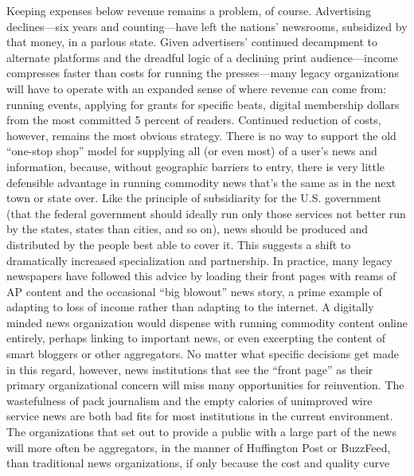 Keeping expenses below revenue remains a problem, of course. Advertising
declines—six years and counting—have left the nations’ newsrooms, subsidized
by that money, in a parlous state. Given advertisers’ continued decampment to
alternate platforms and the dreadful logic of a declining print audience—income
compresses faster than costs for running the presses—many legacy organizations
will have to operate with an expanded sense of where revenue can come from:
running events, applying for grants for specific beats, digital membership dollars
from the most committed 5 percent of readers. Continued reduction of costs,
however, remains the most obvious strategy.
There is no way to support the old ``one-stop shop'' model for supplying all (or
even most) of a user’s news and information, because, without geographic barriers
to entry, there is very little defensible advantage in running commodity news
that’s the same as in the next town or state over. Like the principle of subsidiarity
for the U.S. government (that the federal government should ideally run only
those services not better run by the states, states than cities, and so on), news
should be produced and distributed by the people best able to cover it. This suggests
a shift to dramatically increased specialization and partnership.
In practice, many legacy newspapers have followed this advice by loading their
front pages with reams of AP content and the occasional ``big blowout'' news
story, a prime example of adapting to loss of income rather than adapting to the
internet. A digitally minded news organization would dispense with running
commodity content online entirely, perhaps linking to important news, or even
excerpting the content of smart bloggers or other aggregators. No matter what
specific decisions get made in this regard, however, news institutions that see the
``front page'' as their primary organizational concern will miss many opportunities
for reinvention.
The wastefulness of pack journalism and the empty calories of unimproved wire
service news are both bad fits for most institutions in the current environment.
The organizations that set out to provide a public with a large part of the news
will more often be aggregators, in the manner of Huffington Post or BuzzFeed,
than traditional news organizations, if only because the cost and quality curve

